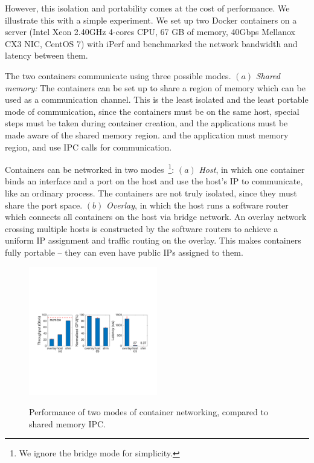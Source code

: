 However, this isolation and portability comes at the cost of performance. We
illustrate this with a simple experiment.  We set up two Docker containers on a
server (Intel Xeon 2.40GHz 4-cores CPU, 67 GB of memory, 40Gbps Mellanox CX3
NIC, CentOS 7) with iPerf and benchmarked the network bandwidth and latency
between them.  

The two containers communicate using three possible modes. $(a)$ {\em Shared
memory:} The containers can be set up to share a region of memory which can be
used as a communication channel. This is the least isolated and the least
portable mode of communication, since the containers must be on the same host,
special steps must be taken during container creation, and the applications must
be made aware of the shared memory region.
and the application must  memory region, and use IPC calls
for communication.

Containers can be networked in two modes~\footnote{We ignore the bridge mode for
simplicity.}: $(a)$ {\em Host}, in which one container binds an interface and a
port on the host and use the host's IP to communicate, like an ordinary process.
The containers are not truly isolated, since they must share the port space.
$(b)$ {\em Overlay}, in which the host runs a software router which connects all
containers on the host via bridge network. An overlay network crossing multiple
hosts is constructed by the software routers to achieve a uniform IP assignment
and traffic routing on the overlay. This makes containers fully portable -- they
can even have public IPs assigned to them.

\begin{figure}[ht]
     \centering 
     \includegraphics[width=0.5\textwidth]{figures/intro/intro_exist2.pdf} 
     \label{fig:three_modes}
     \caption{Performance of two modes of container networking, compared to
     shared memory IPC.} 
\end{figure} 

